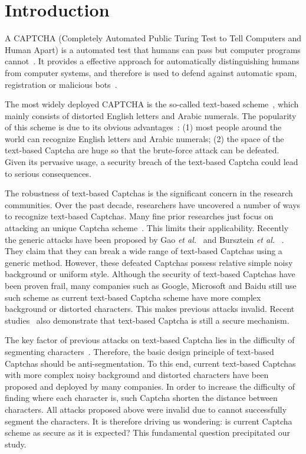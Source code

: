 \section{Introduction}

A CAPTCHA (Completely Automated Public Turing Test to Tell Computers and Human Apart) is a automated test that humans can pass but computer programs cannot~\cite{Von2004Telling}. It provides a effective approach for automatically distinguishing humans from computer systems, and therefore is used to defend against automatic spam, registration or malicious bots~\cite{Von2003CAPTCHA,Tam2008Breaking}.

The most widely deployed CAPTCHA is the so-called text-based scheme~\cite{Yan2008Usability}, which mainly consists of distorted English letters and Arabic numerals. The popularity of this scheme is due to its obvious advantages~\cite{Chellapilla2005Building,Chellapilla2005Computers}: (1) most people around the world can recognize English letters and Arabic numerals; (2) the space of the text-based Captcha are huge so that the brute-force attack can be defeated. Given its pervasive usage, a security breach of the text-based Captcha could lead to serious consequences.

The robustness of text-based Captchas is the significant concern in the research communities. Over the past decade, researchers have uncovered a number of ways to recognize text-based Captchas. Many fine prior researches just focus on attacking an unique Captcha scheme~\cite{Gao2013The,Gao2017Research,Mohamed2014A,Yan2008A}. This limits their applicability. Recently the generic attacks have been proposed by Gao \emph{et al.}~\cite{Gao2016A} and Bursztein \emph{et al.} ~\cite{Bursztein2011Text,Bursztein2014The}. They claim that they can break a wide range of text-based Captchas using a generic method. However, these defeated Captchas possess relative simple noisy background or uniform style. Although the security of text-based Captchas have been proven frail, many companies such as Google, Microsoft and Baidu still use such scheme as current text-based Captcha scheme have more complex background or distorted characters. This makes previous attacks invalid.  Recent studies~\cite{Thomas2013Trafficking,Bursztein2014Easy} also demonstrate that text-based Captcha is still a secure mechanism.

The key factor of previous attacks on text-based Captcha lies in the difficulty of segmenting characters~\cite{Chellapilla2005Computers}. Therefore, the basic design principle of text-based Captchas should be anti-segmentation. To this end, current text-based Captchas with more complex noisy background and distorted characters have been proposed and deployed by many companies. In order to increase the difficulty of finding where each character is, such Captcha shorten the distance between characters. All attacks proposed above were invalid due to cannot successfully segment the characters. It is therefore driving us wondering: is current Captcha scheme as secure as it is expected? This fundamental question precipitated our study.

